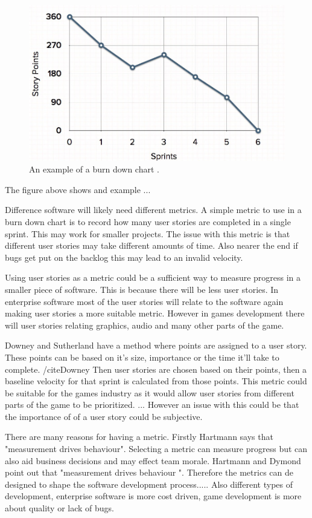 \documentclass{scrartcl}
\begin{document}
\begin{figure}[h]
	\includegraphics[width=1.0\linewidth]{BDChart.jpg}
	\caption{ An example of a burn down chart \cite{MGS}.}
\end{figure}
	
The figure above shows and example ...


Difference software will likely need different metrics. \cite{} A simple metric to use in a burn down chart is to record how many user stories are completed in a single sprint. This may work for smaller projects.  The issue with this metric is that different user stories may take different amounts of time. Also nearer the end if bugs get put on the backlog this may lead to an invalid velocity.

Using user stories as a metric could be a sufficient way to measure progress in a smaller piece of software. This is because there will be less user stories. In enterprise software most of the user stories will relate to the software again making user stories a more suitable metric. However in games development there will user stories relating graphics, audio and many other parts of the game. 

Downey and Sutherland have a method where points are assigned to a user story. These points can be based on it's size, importance or the time it'll take to complete. /cite{Downey} Then user stories are chosen based on their points, then a baseline velocity for that sprint is calculated from those points. This metric could be suitable for the games industry as it would allow user stories from different parts of the game to be prioritized. ... However an issue with this could be that the importance of of a user story could be subjective. 


There are many reasons for having a metric. Firstly Hartmann says that "measurement drives behaviour". Selecting a metric can measure progress but can also aid business decisions and may effect team morale. 
Hartmann and Dymond point out that "measurement drives behaviour ". Therefore the metrics can de designed to shape the software development process.....   Also different types of development, enterprise software is more cost driven, game development is more about quality or lack of bugs. 
\end{document}
